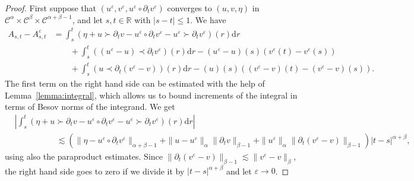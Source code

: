 \documentclass[11pt,a4paper]{article}
\newcommand{\mathd}{\mathrm{d}}
\theoremstyle{remark}
\newcommand{\CC}{\ensuremath{\mathscr{C}}}
\begin{document}
\begin{proof}
  First suppose that $( u^{\varepsilon} ,v^{\varepsilon} ,u^{\varepsilon} \circ \partial_{t} v^{\varepsilon} )$ converges to $( u,v, \eta )$ in
  $\CC^{\alpha} \times \CC^\beta \times \CC^{\alpha + \beta -1}$, and let $s, t \in \mathbb{R}$ with $| s-t | \leqslant 1$.
  We have
  \begin{align}\label{eq:classical rough path pr1} \nonumber
     A_{s,t} -A^{\varepsilon}_{s,t} %
     & = \int_{s}^{t} ( \eta +u \succ \partial_{t} v-u^{\varepsilon} \circ  \partial_{t} v^{\varepsilon} -u^{\varepsilon} \succ \partial_{t}  v^{\varepsilon} ) ( r ) \mathd r \\ \nonumber
     &\qquad + \int_{s}^{t} ( ( u^{\varepsilon} -u ) \prec \partial_{t} v^{\varepsilon} ) ( r ) \mathd r- ( u^{\varepsilon} -u ) ( s ) ( v^{\varepsilon} ( t ) -v^{\varepsilon} ( s ) ) \\
     &\qquad + \int_{s}^{t} ( u \prec \partial_{t} ( v^{\varepsilon} -v ) ) ( r ) \mathd r- ( u ) ( s ) ( ( v^{\varepsilon} -v ) ( t ) - ( v^{\varepsilon} -v ) ( s ) ) .
  \end{align}
  The first term on the right hand side can be estimated with the help of
  Lemma~\ref{lemma:integral}, which allows us to bound increments of the integral in terms of Besov norms of the integrand. We get
  \begin{align*}
     &\left| \int_{s}^{t} ( \eta +u \succ \partial_{t} v-u^{\varepsilon} \circ  \partial_{t} v^{\varepsilon} -u^{\varepsilon} \succ \partial_{t} v^{\varepsilon} ) ( r ) \mathd r \right| \\
     &\hspace{60pt} \lesssim ( \| \eta -u^{\varepsilon} \circ \partial_{t} v^{\varepsilon} \|_{\alpha + \beta -1} + \| u-u^{\varepsilon} \|_{\alpha} \| \partial_{t}  v \|_{\beta -1} + \| u^{\varepsilon} \|_{\alpha} \| \partial_{t} (v^{\varepsilon} -v ) \|_{\beta -1} ) | t-s |^{\alpha + \beta} ,
  \end{align*}
  using also the paraproduct estimates. Since $\| \partial_{t} ( v^{\varepsilon} -v ) \|_{\beta -1} \lesssim \| v^{\varepsilon} -v \|_{\beta}$, the right hand side goes to zero if we divide it by $| t-s |^{\alpha + \beta}$ and let $\varepsilon \rightarrow 0$.
  

\end{proof}
\end{document}
